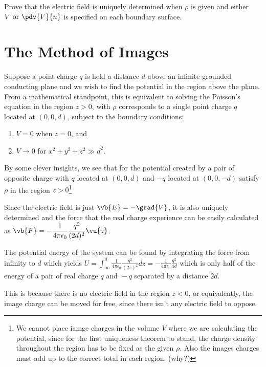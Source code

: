 \documentclass[english,a4paper,12pt]{report}
\begin{document}
{Prove that the electric field is uniquely determined when \(\rho \) is given and either \(V \text { or } \pdv{V}{n} \) is specified on each boundary surface.}
{} 


\section{The Method of Images}

Suppose a point charge \(q\) is held a distance \(d\) above an infinite grounded conducting plane and we wish to find the potential in the region above the plane. From a mathematical standpoint, this is equivalent to solving the Poisson's equation in the region \(z > 0\), with \(\rho \) corresponds to a single point charge  \(q\) located at \((0,0,d )\), subject to the boundary conditions: 
\begin{enumerate}
    \item \(V = 0\) when \(z = 0\), and
    \item \(V \rightarrow 0\) for \(x^2 + y^2 + z^2 \gg d^2\).	
\end{enumerate}

By some clever insights, we see that for the potential created by a pair of opposite charge with \(q\) located at \((0,0,d)\) and \(-q\) located at \((0,0,-d)\) satisfy \(\rho \) in the region \(z > 0\)\footnote{We cannot place iamge charges in the volume \(V\) where we are calculating the potential, since for the first uniqueness theorem to stand, the charge density throughout the region has to be fixed as the given \(\rho \). Also the images charges must add up to the correct total in each region. (why?)} 

Since the electric field is just \(\vb{E} = -\grad{V} \), it is also uniquely determined and the force that the real charge experience can be easily calculated as \(\displaystyle \vb{F} = -\frac{1}{4\pi\epsilon_0} \frac{q^2}{(2d)^2} \vu{z}  \).

The potential energy of the system can be found by integrating the force from infinity to \(d\) which yields \(\displaystyle U = \int_{\infty}^{d} \frac{1}{4\pi\epsilon_0} \frac{q^2}{(2z)^2} dz = -\frac{1}{4\pi\epsilon_0} \frac{q^2}{4d}  \) which is only half of the energy of a pair of real charge \(q \text{ and }  -q\) separated by a distance \(2d\). 

This is because there is no electric field in the region \(z < 0\), or equivalently, the image charge can be moved for free, since there isn't any electric field to oppose. 
\end{document}
